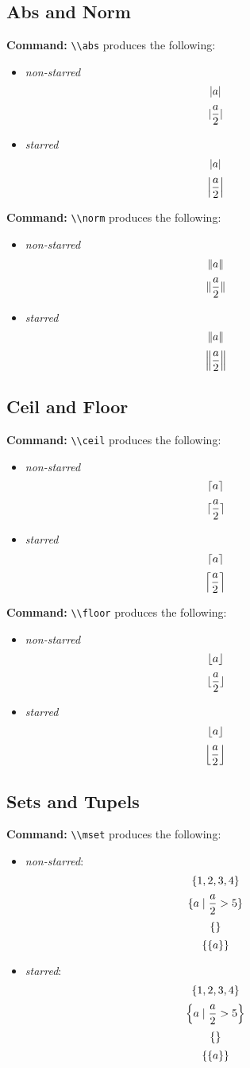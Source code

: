 \documentclass[10pt]{article}
\newcommand{\commandcmd}[1]{\par\noindent\textbf{Command:} \lstinline^\\#1^}
\begin{document}
\subsection{Abs and Norm}
\commandcmd{abs} produces the following:
\begin{itemize}
  \item \emph{non-starred}
        \[\abs{a}\]
        \[\abs{\frac{a}{2}}\]
  \item \emph{starred}
        \[\abs*{a}\]
        \[\abs*{\frac{a}{2}}\]
\end{itemize}

\commandcmd{norm} produces the following:
\begin{itemize}
  \item \emph{non-starred}
        \[\norm{a}\]
        \[\norm{\frac{a}{2}}\]
  \item \emph{starred}
        \[\norm*{a}\]
        \[\norm*{\frac{a}{2}}\]
\end{itemize}

\subsection{Ceil and Floor}
\commandcmd{ceil} produces the following:
\begin{itemize}
  \item \emph{non-starred}
        \[\ceil{a}\]
        \[\ceil{\frac{a}{2}}\]
  \item \emph{starred}
        \[\ceil*{a}\]
        \[\ceil*{\frac{a}{2}}\]
\end{itemize}

\commandcmd{floor} produces the following:
\begin{itemize}
  \item \emph{non-starred}
        \[\floor{a}\]
        \[\floor{\frac{a}{2}}\]
  \item \emph{starred}
        \[\floor*{a}\]
        \[\floor*{\frac{a}{2}}\]
\end{itemize}

\subsection{Sets and Tupels}
\commandcmd{mset} produces the following:
\begin{itemize}
  \item \emph{non-starred}:
        \[\mset{1, 2, 3, 4}\]
        \[\mset{a \mid \frac{a}{2} > 5}\]
        \[\mset{}\]
        \[\mset{\mset{a}}\]
  \item \emph{starred}:
        \[\mset*{1, 2, 3, 4}\]
        \[\mset*{a \mid \frac{a}{2} > 5}\]
        \[\mset*{}\]
        \[\mset*{\mset*{a}}\]
\end{itemize}
\end{document}
